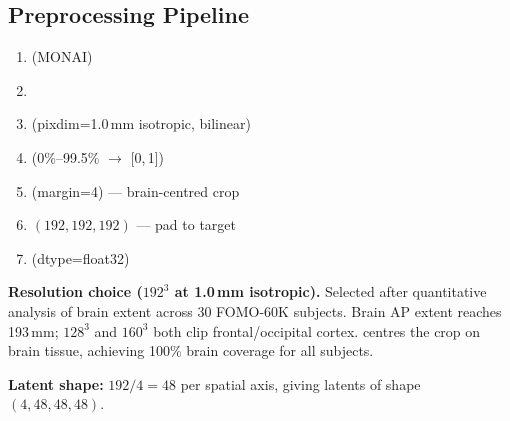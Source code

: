\subsection{Preprocessing Pipeline}

\begin{enumerate}[nosep]
  \item {} (MONAI)
  \item {}
  \item {}(pixdim=1.0\,mm isotropic, bilinear)
  \item {}(0\%--99.5\% $\to$ [0,\,1])
  \item {}(margin=4) --- brain-centred crop
  \item {}$(192,192,192)$ --- pad to target
  \item {}(dtype=float32)
\end{enumerate}

\textbf{Resolution choice ($192^3$ at 1.0\,mm isotropic).}  Selected after
quantitative analysis of brain extent across 30 FOMO-60K subjects.  Brain AP
extent reaches 193\,mm; $128^3$ and $160^3$ both clip frontal/occipital
cortex.   centres the crop on brain tissue, achieving
100\% brain coverage for all subjects.

\textbf{Latent shape:} $192/4 = 48$ per spatial axis, giving latents of shape
$(4,48,48,48)$.

